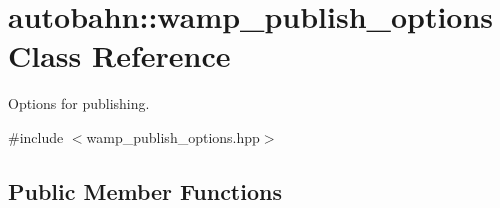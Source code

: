 \hypertarget{classautobahn_1_1wamp__publish__options}{}\section{autobahn\+:\+:wamp\+\_\+publish\+\_\+options Class Reference}
\label{classautobahn_1_1wamp__publish__options}


Options for publishing.  




{\ttfamily \#include $<$wamp\+\_\+publish\+\_\+options.\+hpp$>$}

\subsection*{Public Member Functions}
